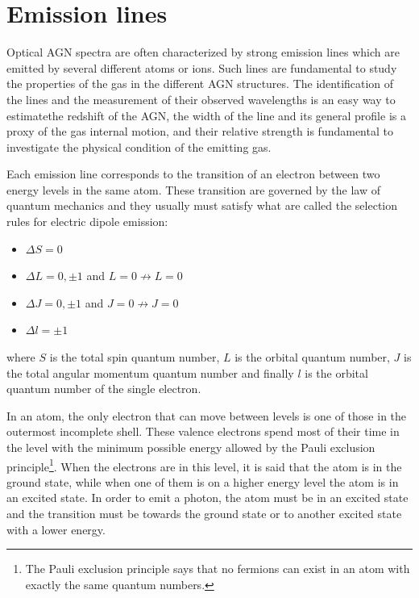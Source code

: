 \documentclass[../main.tex]{subfiles}
\begin{document}
\clearpage 
\section{Emission lines}
\label{sec:emission_line}

Optical AGN spectra are often characterized by strong emission lines which are emitted by several different atoms or ions.
Such lines are fundamental to study the properties of the gas in the different AGN structures.
The identification of the lines and the measurement of their observed wavelengths is an easy way to estimatethe redshift of the AGN, the width of the line and its general profile is a proxy of the gas internal motion, and their relative strength is fundamental to investigate the physical condition of the emitting gas.

Each emission line corresponds to the transition of an electron between two energy levels in the same atom.
These transition are governed by the law of quantum mechanics and they usually must satisfy what are called the selection rules for electric dipole emission:
\begin{itemize}
    \item $\Delta S = 0$
    \item $\Delta L = 0,\pm1$ and $L =0 \not\to L=0$
    \item $\Delta J = 0, \pm 1$ and $J=0 \not\to J=0$
    \item $\Delta l = \pm 1$
\end{itemize}
where $S$ is the total spin quantum number, $L$ is the orbital quantum number, $J$ is the total angular momentum quantum number and finally $l$ is the orbital quantum number of the single electron. 

In an atom, the only electron that can move between levels is one of those in the outermost incomplete shell. 
These valence electrons spend most of their time in the level with the minimum possible energy allowed by the Pauli exclusion principle\footnote{The Pauli exclusion principle says that no fermions can exist in an atom with exactly the same quantum numbers.}.
When the electrons are in this level, it is said that the atom is in the ground state, while when one of them is on a higher energy level the atom is in an excited state.
In order to emit a photon, the atom must be in an excited state and the transition must be towards the ground state or to another excited state with a lower energy.
\end{document}
